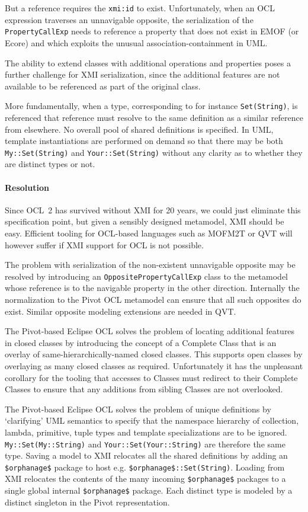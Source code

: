 \documentclass{jot}
\begin{document}
But a reference requires the \verb$xmi:id$ to exist. Unfortunately, when an OCL expression traverses an unnavigable opposite, the serialization of the \verb$PropertyCallExp$ needs to reference a property that does not exist in EMOF (or Ecore) and which exploits the unusual association-containment in UML.

The ability to extend classes with additional operations and properties poses a further challenge for XMI serialization, since the additional features are not available to be referenced as part of the original class.

More fundamentally, when a type, corresponding to for instance \verb$Set(String)$, is referenced that reference must resolve to the same definition as a similar reference from elsewhere. No overall pool of shared definitions is specified. In UML, template instantiations are performed on demand so that there may be both \verb$My::Set(String)$ and \verb$Your::Set(String)$ without any clarity as to whether they are distinct types or not.

\paragraph{Resolution}

Since OCL~2 has survived without XMI for 20 years, we could just eliminate this specification point, but given a sensibly designed metamodel, XMI should be easy. Efficient tooling for OCL-based languages such as MOFM2T or QVT will however suffer if XMI support for OCL is not possible.

The problem with serialization of the non-existent unnavigable opposite may be resolved by introducing an \verb$OppositePropertyCallExp$ class to the metamodel whose reference is to the navigable property in the other direction. Internally the normalization to the Pivot OCL metamodel can ensure that all such opposites do exist. Similar opposite modeling extensions are needed in QVT.

The Pivot-based Eclipse OCL solves the problem of locating additional features in closed classes by introducing the concept of a Complete Class that is an overlay of same-hierarchically-named closed classes. This supports open classes by overlaying as many closed classes as required. Unfortunately it has the unpleasant corollary for the tooling that accesses to Classes must redirect to their Complete Classes to ensure that any additions from sibling Classes are not overlooked.

The Pivot-based Eclipse OCL solves the problem of unique definitions by `clarifying' UML semantics to specify that the namespace hierarchy of collection, lambda, primitive, tuple types and template specializations are to be ignored. \verb$My::Set(My::String)$ and \verb$Your::Set(Your::String)$ are therefore the same type. Saving a model to XMI relocates all the shared definitions by adding an \verb|$orphanage$| package to host e.g. \verb|$orphanage$::Set(String)|. Loading from XMI relocates the contents of the many incoming \verb|$orphanage$| packages to a single global internal \verb|$orphanage$| package. Each distinct type is modeled by a distinct singleton in the Pivot representation.
\end{document}
